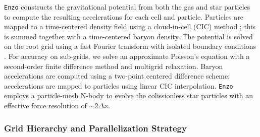 \documentclass[11pt]{article}
\begin{document}
\texttt{Enzo} constructs the gravitational potential from both the gas and star particles to compute the resulting accelerations for each cell and particle. Particles are mapped to a time-centered density field using a cloud-in-cell (CIC) method \citep{HockneyEastwood1988}; this is summed together with a time-centered baryon density. The potential is solved on the root grid using a fast Fourier transform with isolated boundary conditions \citep{James1977}. For accuracy on sub-grids, we solve an approximate Poisson's equation with a second-order finite difference method and multigrid relaxation. Baryon accelerations are computed using a two-point centered difference scheme; accelerations are mapped to particles using linear CIC interpolation. \texttt{Enzo} employs a particle-mesh N-body to evolve the colissionless star particles with an effective force resolution of $\sim 2 \Delta x$.

\subsubsection{Grid Hierarchy and Parallelization Strategy}

\end{document}
